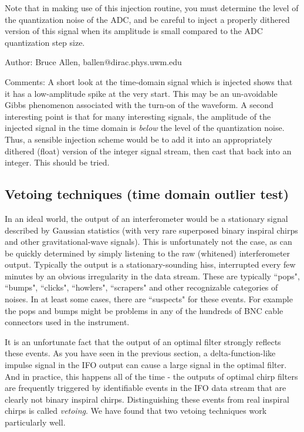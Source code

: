 Note that in making use of this injection routine, you must determine the level
of the quantization noise of the ADC, and be careful to inject a properly dithered
version of this signal when its amplitude is small compared to the ADC quantization step size.

\begin{description}
\item{Author:}
Bruce Allen, ballen@dirac.phys.uwm.edu
\item{Comments:}
A short look at the time-domain signal which is injected shows that it
has a low-amplitude spike at the very start.  This may be an
un-avoidable Gibbs phenomenon associated with the turn-on of the
waveform.  A second interesting point is that for many interesting
signals, the amplitude of the injected signal in the time domain is
{\it below} the level of the quantization noise.  Thus, a sensible
injection scheme would be to add it into an appropriately dithered
(float) version of the integer signal stream, then cast that back into
an integer.  This should be tried.
\end{description}
\clearpage

\subsection{Vetoing techniques (time domain outlier test)}
\label{ss:veto-time}

In an ideal world, the output of an interferometer would be a
stationary signal described by Gaussian statistics (with very rare
superposed binary inspiral chirps and other gravitational-wave
signals).  This is unfortunately not the case, as can be quickly
determined by simply listening to the raw (whitened) interferometer
output.  Typically the output is a stationary-sounding hiss, interrupted
every few minutes by an obvious irregularity in the data stream.  These
are typically ``pops", ``bumps", ``clicks", ``howlers", ``scrapers" and
other recognizable categories of noises.  In at least some cases, there
are ``suspects" for these events.  For example the pops and bumps might
be problems in any of the hundreds of BNC cable connectors used in the
instrument.

It is an unfortunate fact that the output of an optimal filter strongly
reflects these events.  As you have seen in the previous section, a
delta-function-like impulse signal in the IFO output can cause a large
signal in the optimal filter.  And in practice, this happens all of the
time - the outputs of optimal chirp filters are frequently triggered by
identifiable events in the IFO data stream that are clearly not binary
inspiral chirps.  Distinguishing these events from real inspiral chirps
is called {\it vetoing}.  We have found that two vetoing techniques
work particularly well.

